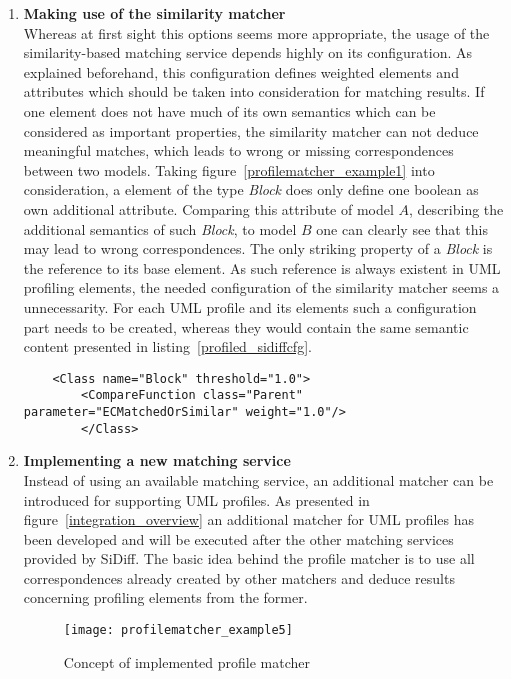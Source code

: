 \begin{enumerate}
  \item \textbf{Making use of the similarity matcher}\\  
  		Whereas at first sight this options seems more appropriate, the usage of the
  		similarity-based matching service depends highly on its configuration. As
  		explained beforehand, this configuration defines weighted elements and
  		attributes which should be taken into consideration for matching results. If
  		one element does not have much of its own semantics which can be considered
  		as important properties, the similarity matcher can not deduce meaningful
  		matches, which leads to wrong or missing correspondences between two models.
  		Taking figure~\ref{profilematcher_example1} into consideration, a element of
  		the type \textit{Block} does only define one boolean as own additional
  		attribute.
  		Comparing this attribute of model $A$, describing the additional semantics
  		of such \textit{Block}, to model $B$ one can clearly see that
  		this may lead to wrong correspondences. The only striking property of a \textit{Block} is the
  		reference to its base element. As such reference is always existent in
  		\ac{UML} profiling elements, the needed configuration of the similarity
  		matcher seems a unnecessarity. For each \ac{UML} profile and its elements
  		such a configuration part needs to be created, whereas they would contain
  		the same semantic content presented in listing~\ref{profiled_sidiffcfg}.
    \begin{lstlisting}
    <Class name="Block" threshold="1.0">		
		<CompareFunction class="Parent" parameter="ECMatchedOrSimilar" weight="1.0"/>
		</Class>\end{lstlisting}
  \item \textbf{Implementing a new matching service}\\
  		Instead of using an available matching service, an additional matcher can be
  		introduced for supporting \ac{UML} profiles. As presented in
  		figure~\ref{integration_overview} an additional matcher for \ac{UML}
  		profiles has been developed and will be executed after the other matching
  		services provided by SiDiff. The basic idea behind the profile matcher is to
  		use all correspondences already created by other matchers and deduce results
  		concerning profiling elements from the former.
\begin{figure}[h!]
\begin{center}
\texttt{[image: profilematcher\_example5]}\\
\end{center}
\caption{Concept of implemented profile matcher}
\label{profilematcher_example5}
\end{figure}


\end{enumerate}
